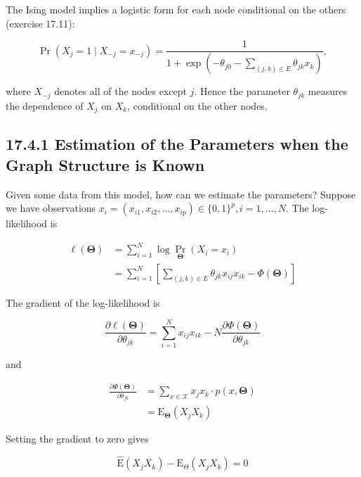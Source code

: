 \documentclass[10pt]{article}
\begin{document}
The Ising model implies a logistic form for each node conditional on the others (exercise 17.11):


\begin{equation*}
\operatorname{Pr}\left(X_{j}=1 \mid X_{-j}=x_{-j}\right)=\frac{1}{1+\exp \left(-\theta_{j 0}-\sum_{(j, k) \in E} \theta_{j k} x_{k}\right)}, \tag{17.30}
\end{equation*}


where $X_{-j}$ denotes all of the nodes except $j$. Hence the parameter $\theta_{j k}$ measures the dependence of $X_{j}$ on $X_{k}$, conditional on the other nodes.

\subsection*{17.4.1 Estimation of the Parameters when the Graph Structure is Known}
Given some data from this model, how can we estimate the parameters? Suppose we have observations $x_{i}=\left(x_{i 1}, x_{i 2}, \ldots, x_{i p}\right) \in\{0,1\}^{p}, i=1, \ldots, N$. The log-likelihood is


\begin{align*}
\ell(\boldsymbol{\Theta}) & =\sum_{i=1}^{N} \log \operatorname{Pr}_{\boldsymbol{\Theta}}\left(X_{i}=x_{i}\right) \\
& =\sum_{i=1}^{N}\left[\sum_{(j, k) \in E} \theta_{j k} x_{i j} x_{i k}-\Phi(\boldsymbol{\Theta})\right] \tag{17.31}
\end{align*}


The gradient of the log-likelihood is


\begin{equation*}
\frac{\partial \ell(\boldsymbol{\Theta})}{\partial \theta_{j k}}=\sum_{i=1}^{N} x_{i j} x_{i k}-N \frac{\partial \Phi(\boldsymbol{\Theta})}{\partial \theta_{j k}} \tag{17.32}
\end{equation*}


and


\begin{align*}
\frac{\partial \Phi(\boldsymbol{\Theta})}{\partial \theta_{j k}} & =\sum_{x \in \mathcal{X}} x_{j} x_{k} \cdot p(x, \boldsymbol{\Theta}) \\
& =\mathrm{E}_{\boldsymbol{\Theta}}\left(X_{j} X_{k}\right) \tag{17.33}
\end{align*}


Setting the gradient to zero gives


\begin{equation*}
\hat{\mathrm{E}}\left(X_{j} X_{k}\right)-\mathrm{E}_{\Theta}\left(X_{j} X_{k}\right)=0 \tag{17.34}
\end{equation*}
\end{document}
